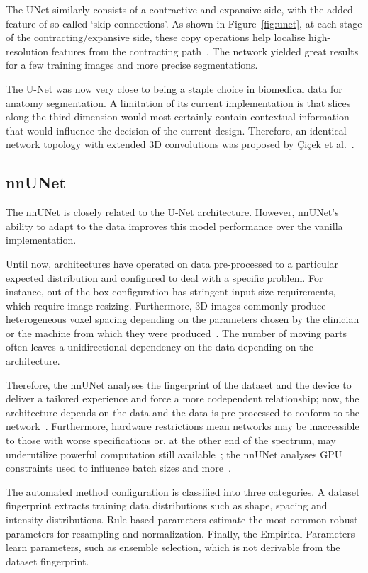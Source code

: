\documentclass[12pt,twoside]{report}
\begin{document}
The UNet similarly consists of a contractive and expansive side, with the added feature of so-called `skip-connections'. As shown in Figure~\ref{fig:unet}, at each stage of the contracting/expansive side, these copy operations help localise high-resolution features from the contracting path~\cite{U-Net}. The network yielded great results for a few training images and more precise segmentations.

The U-Net was now very close to being a staple choice in biomedical data for anatomy segmentation. A limitation of its current implementation is that slices along the third dimension would most certainly contain contextual information that would influence the decision of the current design. Therefore, an identical network topology with extended 3D convolutions was proposed by \c{C}i{\c{c}}ek et al.~\cite{DBLP:journals/corr/CicekALBR16}.

\subsection{nnUNet}\label{sect:nnunet}

The nnUNet is closely related to the U-Net architecture. However, nnUNet's ability to adapt to the data improves this model performance over the vanilla implementation.

Until now, architectures have operated on data pre-processed to a particular expected distribution and configured to deal with a specific problem. For instance, out-of-the-box configuration has stringent input size requirements, which require image resizing. Furthermore, 3D images commonly produce heterogeneous voxel spacing depending on the parameters chosen by the clinician or the machine from which they were produced~\cite{nnunet}. The number of moving parts often leaves a unidirectional dependency on the data depending on the architecture. 

Therefore, the nnUNet analyses the fingerprint of the dataset and the device to deliver a tailored experience and force a more codependent relationship; now, the architecture depends on the data and the data is pre-processed to conform to the network~\cite{nnunet}. Furthermore, hardware restrictions mean networks may be inaccessible to those with worse specifications or, at the other end of the spectrum, may underutilize powerful computation still available~\cite{nnunet}; the nnUNet analyses GPU constraints used to influence batch sizes and more~\cite{nnunet-git-paper}.

The automated method configuration is classified into three categories. A dataset fingerprint extracts training data distributions such as shape, spacing and intensity distributions. Rule-based parameters estimate the most common robust parameters for resampling and normalization. Finally, the Empirical Parameters learn parameters, such as ensemble selection, which is not derivable from the dataset fingerprint.
\end{document}
